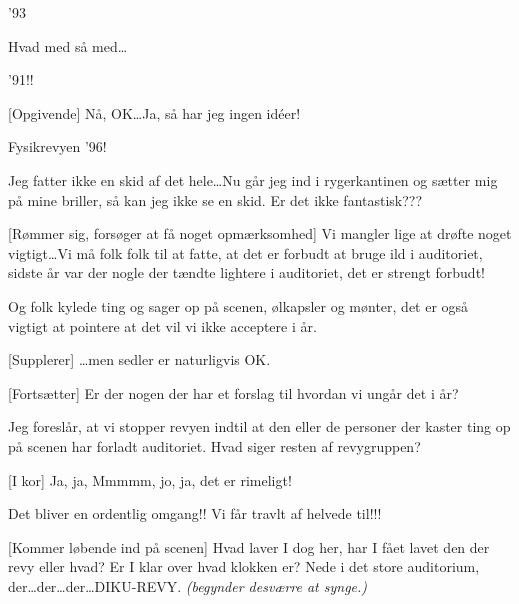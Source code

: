 \documentclass[10pt]{article}
\begin{document}
\begin{sketch}
 '93

 Hvad med så med\ldots

 '91!!

[Opgivende] Nå, OK\ldots Ja, så har jeg ingen id\'eer!

 Fysikrevyen '96!


 Jeg fatter ikke en skid af det hele\ldots Nu går jeg ind i
rygerkantinen og sætter mig på mine briller, så kan jeg ikke se en skid. Er
det ikke fantastisk???

 [Rømmer sig, forsøger at få noget opmærksomhed] Vi
mangler lige at drøfte noget vigtigt\ldots Vi må folk folk til at fatte, at
det er forbudt at bruge ild i auditoriet, sidste år var der nogle der
tændte lightere i auditoriet, det er strengt forbudt!

 Og folk kylede ting og sager op på scenen, ølkapsler og
mønter, det er også vigtigt at pointere at det vil vi ikke acceptere i år.

 [Supplerer] \ldots men sedler er naturligvis OK.

 [Fortsætter] Er der nogen der har et forslag til hvordan
vi ungår det i år? 

 Jeg foreslår, at vi stopper revyen indtil at den eller
de personer der kaster ting op på scenen har forladt auditoriet. Hvad siger
resten af revygruppen?

 [I kor] Ja, ja, Mmmmm, jo, ja, det er rimeligt!

 Det bliver en ordentlig omgang!!
 Vi får travlt af helvede til!!!


 [Kommer løbende ind på scenen] Hvad laver I dog her, har I
fået lavet den der revy eller hvad? Er I klar over hvad klokken
er? Nede i det store auditorium, der\ldots der\ldots der\ldots DIKU-REVY. {\em
(begynder desværre at synge.)}



\end{sketch}
\end{document}
